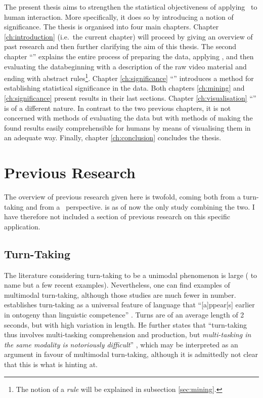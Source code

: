 The present thesis aims to strengthen the statistical objectiveness of applying \fpmlower\ to human interaction. More specifically, it does so by introducing a notion of significance. The thesis is organised into four main chapters.
Chapter \ref{ch:introduction} (i.e.\ the current chapter) will proceed by giving an overview of past research and then further clarifying the aim of this thesis.
The second chapter ``\frequentpatternmining'' explains the entire process of preparing the data, applying \fpmlower, and then evaluating the data\dash beginning with a description of the raw video material and ending with abstract rules\footnote{The notion of a \emph{rule} will be explained in subsection \ref{sec:mining}.}.
Chapter \ref{ch:significance} ``\significance'' introduces a method for establishing statistical significance in the data. Both chapters \ref{ch:mining} and \ref{ch:significance} present results in their last sections.
Chapter \ref{ch:visualisation} ``\visualisation'' is of a different nature. In contrast to the two previous chapters, it is not concerned with methods of evaluating the data but with methods of making the found results easily comprehensible for humans by means of visualising them in an adequate way.
Finally, chapter \ref{ch:conclusion} concludes the thesis.

\section{Previous Research}
The overview of previous research given here is twofold, coming both from a turn-taking and from a \fpmlower\ perspective. \citet{rohlfing18} is as of now the only study combining the two. I have therefore not included a section of previous research on this specific application.


\subsection{Turn-Taking}
\label{ssec:turntaking}
The literature considering turn-taking to be a unimodal phenomenon is large (\citep{casillas16,freud16,heldner10} to name but a few recent examples). Nevertheless, one can find examples of multimodal turn-taking, although those studies are much fewer in number.
\citet{levinson16} establishes turn-taking as a universal feature of language that ``[a]ppear[s] earlier in ontogeny than linguistic competence'' \citep[]{levinson16}. Turns are of an average length of 2 seconds, but with high variation in length. He further states that ``turn-taking thus involves multi-tasking comprehension and production, but \emph{multi-tasking in the same modality is notoriously difficult}'' \citep[, emphasis mine]{levinson16}, which may be interpreted as an argument in favour of multimodal turn-taking, although it is admittedly not clear that this is what \citeauthor{levinson16} is hinting at.%

